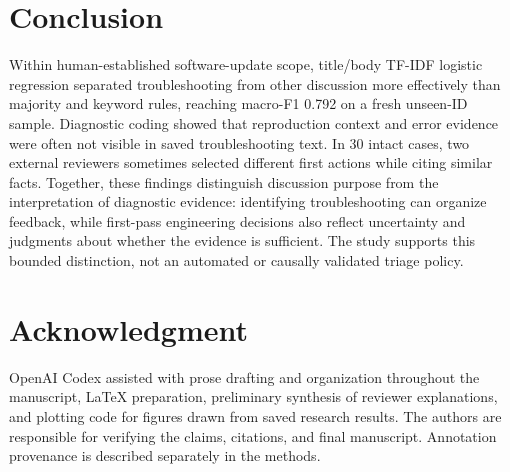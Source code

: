 \documentclass[conference,letterpaper]{IEEEtran}
\begin{document}
\section{Conclusion}
Within human-established software-update scope, title/body TF-IDF logistic regression separated troubleshooting from other discussion more effectively than majority and keyword rules, reaching macro-F1 0.792 on a fresh unseen-ID sample. Diagnostic coding showed that reproduction context and error evidence were often not visible in saved troubleshooting text. In 30 intact cases, two external reviewers sometimes selected different first actions while citing similar facts. Together, these findings distinguish discussion purpose from the interpretation of diagnostic evidence: identifying troubleshooting can organize feedback, while first-pass engineering decisions also reflect uncertainty and judgments about whether the evidence is sufficient. The study supports this bounded distinction, not an automated or causally validated triage policy.

\section*{Acknowledgment}
OpenAI Codex assisted with prose drafting and organization throughout the manuscript, LaTeX preparation, preliminary synthesis of reviewer explanations, and plotting code for figures drawn from saved research results. The authors are responsible for verifying the claims, citations, and final manuscript. Annotation provenance is described separately in the methods.



\end{document}
